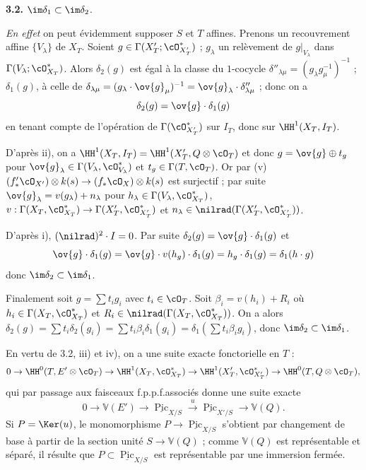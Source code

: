 \begin{flushright}
\textbf{3.2.} $\im \delta_1 \subset \im \delta_2$.
\end{flushright}

\noindent\textit{En effet} on peut évidemment supposer $S$ et $T$ affines. Prenons un recouvrement affine $\{V_{\lambda}\}$ de $X_T$. Soient $g \in \Gamma(X'_T; \cO_{X'_T}^*)$ ; $g_{\lambda}$ un relèvement de $g|_{V_{\lambda}}$ dans $\Gamma(V_{\lambda}; \cO_{X_T}^*)$. Alors $\delta_2(g)$ est égal à la classe du $1$-cocycle $\delta''_{\lambda \mu} = (g_{\lambda} g_{\mu}^{-1})^{-1}$ ; $\delta_1(g)$, à celle de $\delta_{\lambda \mu} = (g_{\lambda} \cdot \ov{g}_{\mu})^{-1} = \ov{g}_{\lambda} \cdot \delta''_{\lambda \mu}$ ; donc on a
\[
\delta_2(g) = \ov{g} \cdot \delta_1(g)
\]
en tenant compte de l'opération de $\Gamma(\cO_{X'_T}^*)$ sur $I_T$, donc sur $\HH^1(X_T, I_T)$.

D'après ii), on a $\HH^1(X_T, I_T) = \HH^1(X'_T, Q \otimes \cO_T)$ et donc $g = \ov{g} \oplus t_g$ pour $\ov{g}_{\lambda} \in \Gamma(V_{\lambda}, \cO_{V_{\lambda}}^*)$ et $t_g \in \Gamma(T, \cO_T)$. Or par (v) $(f'_* \cO_{X'}) \otimes k(s) \to (f_* \cO_X) \otimes k(s)$ est surjectif ; par suite $\ov{g}_{\lambda} = v(g_{\lambda}) + n_{\lambda}$ pour $h_{\lambda} \in \Gamma(V_{\lambda}, \cO_{X_T}^*)$, $v : \Gamma(X_T, \cO_{X_T}^*) \to \Gamma(X'_T, \cO_{X'_T}^*)$ et $n_{\lambda} \in \nilrad(\Gamma(X'_T, \cO_{X'_T}^*))$.

\noindent
D'après i), $(\nilrad)^2 \cdot I = 0$. Par suite $\delta_2(g) = \ov{g} \cdot \delta_1(g)$ et
\[
\ov{g} \cdot \delta_1(g) = \ov{g} \cdot v(h_g) \cdot \delta_1(g) = h_g \cdot \delta_1(g) = \delta_1(h \cdot g)
\]
donc $\im \delta_2 \subset \im \delta_1$.

Finalement soit $g = \sum t_i g_i$ avec $t_i \in \cO_T$. Soit $\beta_i = v(h_i) + R_i$ où $h_i \in \Gamma(X_T, \cO_{X_T}^*)$ et $R_i \in \nilrad(\Gamma(X_T, \cO_{X_T}^*))$. On a alors $\delta_2(g) = \sum t_i \delta_2(g_i) = \sum t_i \beta_i \delta_1(g_i) = \delta_1(\sum t_i \beta_i g_i)$, donc $\im \delta_2 \subset \im \delta_1$.

En vertu de 3.2, iii) et iv), on a une suite exacte fonctorielle en $T$ :
\[
0 \to \HH^0(T, E' \otimes \cO_T) \to \HH^1(X_T, \cO_{X_T}^*) \to \HH^1(X'_T, \cO_{X'_T}^*) \to \HH^0(T, Q \otimes \cO_T),
\]
qui par passage aux faisceaux f.p.p.f.\@ associés donne une suite exacte
\[
0 \to \mathbb{V}(E') \to \underline{\operatorname{Pic}}_{X/S} \xrightarrow{u} \underline{\operatorname{Pic}}_{X'/S} \to \mathbb{V}(Q).
\]
Si $P = \Ker(u)$, le monomorphisme $P \to \underline{\operatorname{Pic}}_{X/S}$ s'obtient par changement de base à partir de la section unité $S \to \mathbb{V}(Q)$ ; comme $\mathbb{V}(Q)$ est représentable et séparé, il résulte que $P \subset \underline{\operatorname{Pic}}_{X/S}$ est représentable par une immersion fermée.

